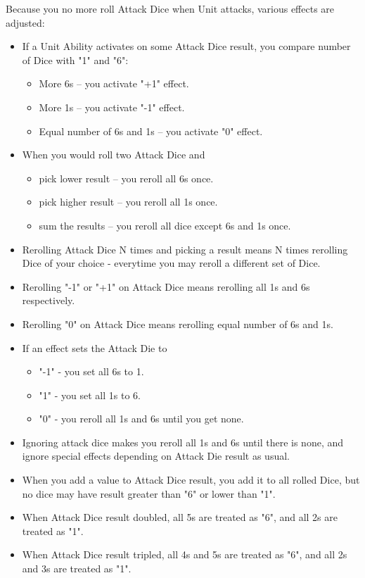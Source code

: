 \begin{multicols*}{2}
    Because you no more roll Attack Dice when Unit attacks, various effects are adjusted:
    \begin{itemize}
        \item If a Unit Ability activates on some Attack Dice result, you compare number of Dice with "1" and "6": \begin{itemize}
            \item More 6s -- you activate "+1" effect.
            \item More 1s -- you activate "-1" effect.
            \item Equal number of 6s and 1s -- you activate "0" effect.
        \end{itemize}
        \item When you would roll two Attack Dice and \begin{itemize}
            \item pick lower result -- you reroll all 6s once.
            \item pick higher result -- you reroll all 1s once.
            \item sum the results -- you reroll all dice except 6s and 1s once.
        \end{itemize} 
        \item Rerolling Attack Dice N times and picking a result means N times rerolling Dice of your choice - everytime you may reroll a different set of Dice.
        \item Rerolling "-1" or "+1" on Attack Dice means rerolling all 1s and 6s respectively.
        \item Rerolling "0" on Attack Dice means rerolling equal number of 6s and 1s.
        \item If an effect sets the Attack Die to \begin{itemize}
            \item "-1" - you set all 6s to 1.
            \item "1" - you set all 1s to 6.
            \item "0" - you reroll all 1s and 6s until you get none.
        \end{itemize}
        \item Ignoring attack dice makes you reroll all 1s and 6s until there is none, and ignore special effects depending on Attack Die result as usual.
        \item When you add a value to Attack Dice result, you add it to all rolled Dice, but no dice may have result greater than "6" or lower than "1".
        \item When Attack Dice result doubled, all 5s are treated as "6", and all 2s are treated as "1".
        \item When Attack Dice result tripled, all 4s and 5s are treated as "6", and all 2s and 3s are treated as "1".
    \end{itemize}
    

\end{multicols*}
